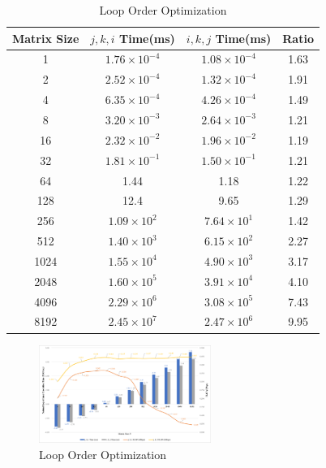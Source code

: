 \documentclass[conference]{IEEEtran}
\begin{document}
	\begin{table}[h]
		\centering
		\caption{Loop Order Optimization}
		\label{tab:matrix-mult-perf}
		\setlength\extrarowheight{2pt}
		\begin{tabular}{|c|c|c|c|}
			\hline
			Matrix Size & $j, k, i$ Time(ms) & $i, k, j$ Time(ms) & Ratio \\ \hline
			1          & $1.76\times 10^{-4}$       & $1.08\times 10^{-4}$         & 1.63              \\ 
			2          & $2.52\times 10^{-4}$       & $1.32\times 10^{-4}$         & 1.91              \\ 
			4          & $6.35\times 10^{-4}$       & $4.26\times 10^{-4}$         & 1.49              \\ 
			8          & $3.20\times 10^{-3}$       & $2.64\times 10^{-3}$         & 1.21              \\ 
			16         & $2.32\times 10^{-2}$       & $1.96\times 10^{-2}$         & 1.19              \\ 
			32         & $1.81\times 10^{-1}$       & $1.50\times 10^{-1}$         & 1.21              \\ 
			64         & 1.44                        & 1.18                         & 1.22              \\
			128        & 12.4                        & 9.65                         & 1.29              \\
			256        & $1.09\times 10^{2}$        & $7.64\times 10^{1}$          & 1.42              \\ 
			512        & $1.40\times 10^{3}$        & $6.15\times 10^{2}$          & 2.27              \\ 
			1024       & $1.55\times 10^{4}$        & $4.90\times 10^{3}$          & 3.17              \\ 
			2048       & $1.60\times 10^{5}$        & $3.91\times 10^{4}$          & 4.10              \\ 
			4096       & $2.29\times 10^{6}$        & $3.08\times 10^{5}$          & 7.43              \\ 
			8192       & $2.45\times 10^{7}$        & $2.47\times 10^{6}$          & 9.95              \\ 
			\hline
		\end{tabular}
	\end{table}
	
	\begin{figure}[htbp]
		\centerline{\includegraphics[width=0.5\textwidth]{fig7.png}}
		\caption{Loop Order Optimization}
		\label{fig::loop order}
	\end{figure}
\end{document}
